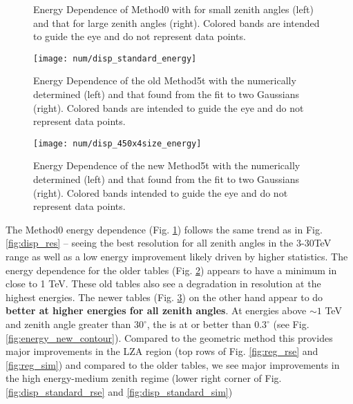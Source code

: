\documentclass[main.tex]{subfiles}
\begin{document}
\begin{figure}[htbp]
  \centering
  \caption[Energy Dependence of Method0.]{Energy Dependence of Method0 with \rse for small zenith angles (left) and that for large zenith angles (right). Colored bands are intended to guide the eye and do not represent data points.}
  \label{fig:energy_reg}
\end{figure}

\begin{figure}[htbp]
  \centering
  \texttt{[image: num/disp\_standard\_energy]}
  \caption[Energy Dependence of the old Method5t.]{Energy Dependence of the old Method5t with the numerically determined \rse (left) and that found from the fit to two Gaussians (right). Colored bands are intended to guide the eye and do not represent data points.}
  \label{fig:energy_disp_standard}    
\end{figure}

\begin{figure}[htbp]
  \centering
  \texttt{[image: num/disp\_450x4size\_energy]}
  \caption[Energy Dependence of the new Method5t.]{Energy Dependence of the new Method5t with the numerically determined \rse (left) and that found from the fit to two Gaussians (right). Colored bands intended to guide the eye and do not represent data points.}
  \label{fig:energy_disp_450}    
\end{figure}

The Method0 energy dependence (Fig. \ref{fig:energy_reg}) follows the same trend as in Fig. \ref{fig:disp_res} -- seeing the best resolution for all zenith angles in the 3-30TeV range as well as a low energy improvement likely driven by higher statistics. The energy dependence for the older \disp tables (Fig. \ref{fig:energy_disp_standard}) appears to have a minimum in \rse close to 1 TeV. These old \disp tables also see a degradation in resolution at the highest energies. The newer \disp tables (Fig. \ref{fig:energy_disp_450}) on the other hand appear to do {\bf better at higher energies for all zenith angles}. At energies above $\sim 1$ TeV and zenith angle greater than $30^\circ$, the \rse is at or better than $0.3^\circ$ (see Fig. \ref{fig:energy_new_contour}). Compared to the geometric method this provides major improvements in the LZA region (top rows of Fig. \ref{fig:reg_rse} and \ref{fig:reg_sim}) and compared to the older \disp tables, we see major improvements in the high energy-medium zenith regime (lower right corner of Fig. \ref{fig:disp_standard_rse} and \ref{fig:disp_standard_sim})
\end{document}
